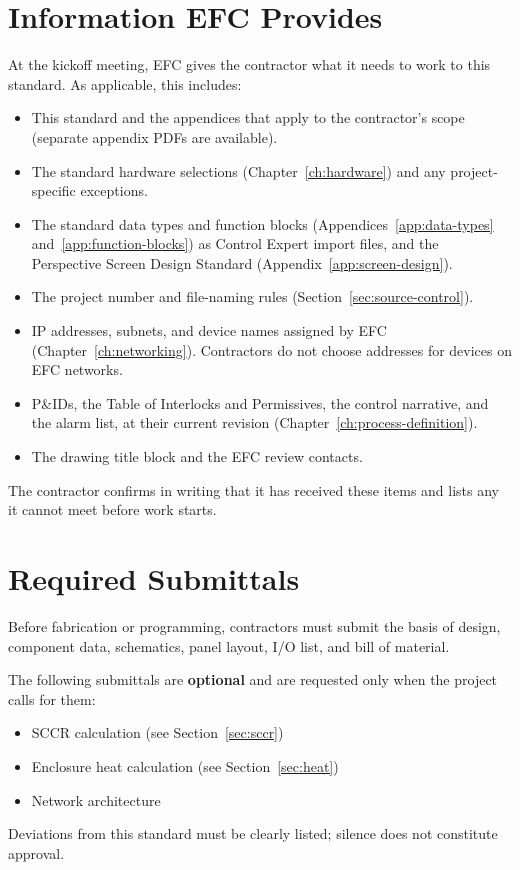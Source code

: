 \section[Information EFC Provides]{Information EFC Provides \newmark}\label{sec:efc-provides}
At the kickoff meeting, EFC gives the contractor what it needs to work to this standard. As applicable, this includes:
\begin{itemize}[itemsep=1pt]
  \item This standard and the appendices that apply to the contractor's scope (separate appendix PDFs are available).
  \item The standard hardware selections (Chapter~\ref{ch:hardware}) and any project-specific exceptions.
  \item The standard data types and function blocks (Appendices~\ref{app:data-types} and~\ref{app:function-blocks}) as Control Expert import files, and the Perspective Screen Design Standard (Appendix~\ref{app:screen-design}).
  \item The project number and file-naming rules (Section~\ref{sec:source-control}).
  \item IP addresses, subnets, and device names assigned by EFC (Chapter~\ref{ch:networking}). Contractors do not choose addresses for devices on EFC networks.
  \item P\&IDs, the Table of Interlocks and Permissives, the control narrative, and the alarm list, at their current revision (Chapter~\ref{ch:process-definition}).
  \item The drawing title block and the EFC review contacts.
\end{itemize}
The contractor confirms in writing that it has received these items and lists any it cannot meet before work starts.

\section{Required Submittals}
Before fabrication or programming, contractors must submit the basis of design, component data, schematics, panel layout, I/O list, and bill of material.

The following submittals are \textbf{optional} and are requested only when the project calls for them:
\begin{itemize}[itemsep=1pt]
  \item SCCR calculation (see Section~\ref{sec:sccr})
  \item Enclosure heat calculation (see Section~\ref{sec:heat})
  \item Network architecture
\end{itemize}
Deviations from this standard must be clearly listed; silence does not constitute approval.

